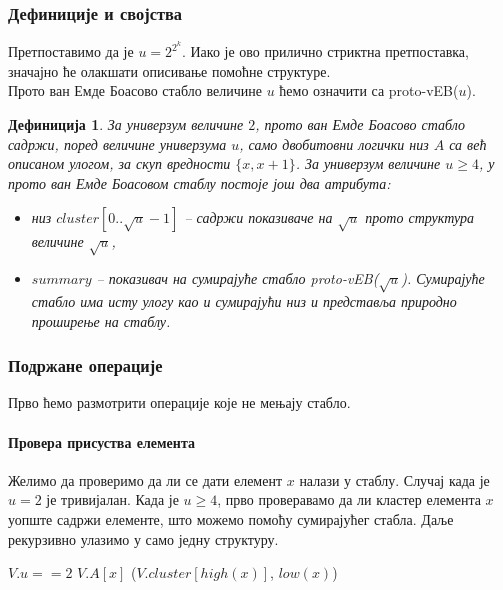 \documentclass[11pt, a4paper]{article}
\newtheorem{definicija}{\selectlanguage{russian} Дефиниција} [subsection]
\theoremstyle{remark}
\numberwithin{equation}{section}
\begin{document}
	\subsubsection{Дефиниције и својства}
	
	Претпоставимо да је $u=2^{2^k}$. Иако је ово прилично стриктна претпоставка, значајно ће олакшати описивање помоћне структуре. \\
	
	\noindent Прото ван Емде Боасово стабло величине $u$ ћемо означити са proto-vEB($u$).
	
	\begin{definicija}
		\normalfont
		
		\noindent За универзум величине $2$, прото ван Емде Боасово стабло садржи, поред величине универзума $u$, само двобитовни логички низ $A$ са већ описаном улогом, за скуп вредности $\{x, x+1\}$. За универзум величине $u \geq 4$, у прото ван Емде Боасовом стаблу постоје још два атрибута:
		\begin{itemize}
			\item  низ $cluster[0..\sqrt{u}-1]$ -- садржи показиваче на $\sqrt{u}$ прото структура величине $\sqrt u$,
			\item $summary$ -- показивач на сумирајуће стабло proto-vEB($\sqrt u$). Сумирајуће стабло има исту улогу као и сумирајући низ и представља природно проширење на стаблу.
		\end{itemize}
	\end{definicija}
	
	\subsubsection{Подржане операције}
	Прво ћемо размотрити операције које не мењају стабло.
	
	\paragraph{Провера присуства елемента}
	Желимо да проверимо да ли се дати елемент $x$ налази у стаблу. Случај када је $u=2$ је тривијалан. Када је $u \geq 4$, прво проверавамо да ли кластер елемента $x$ уопште садржи елементе, што можемо помоћу сумирајућег стабла. Даље рекурзивно улазимо у само једну структуру.
	\begin{codebox}
		\li \If $V.u==2$
		\li \Do \Return $V.A[x]$
		\End
		\li \Return {}($V.cluster[high(x)]$, $low(x)$)
	\end{codebox}
\end{document}
